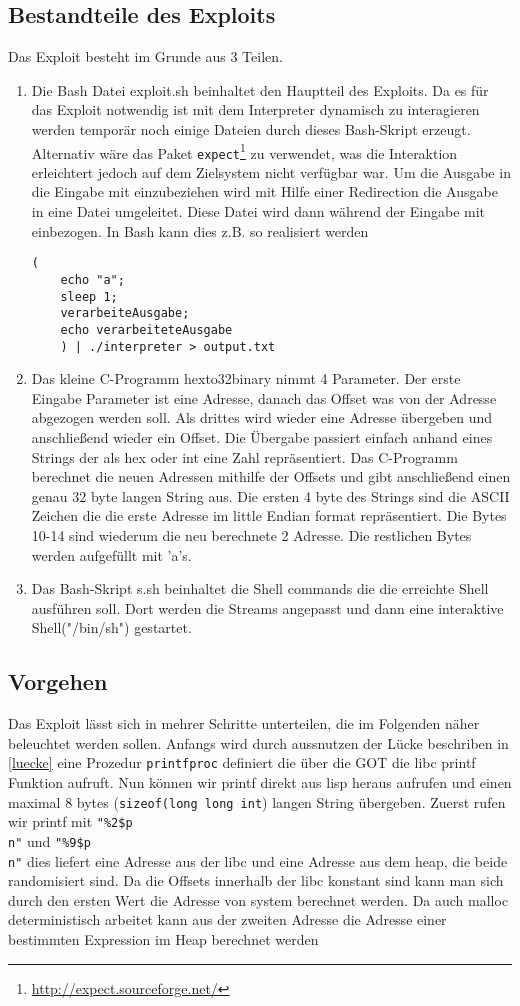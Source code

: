 \subsection{Bestandteile des Exploits}
Das Exploit besteht im Grunde aus 3 Teilen.
\begin{enumerate}
\item Die Bash Datei exploit.sh beinhaltet den Hauptteil des Exploits. Da es für das Exploit notwendig ist mit dem Interpreter dynamisch zu interagieren werden temporär noch einige Dateien durch dieses Bash-Skript erzeugt. 
Alternativ wäre das Paket \texttt{expect}\footnote{\url{http://expect.sourceforge.net/}} zu verwendet, was die Interaktion erleichtert jedoch auf dem Zielsystem nicht verfügbar war. 
Um die Ausgabe in die Eingabe mit einzubeziehen wird mit Hilfe einer Redirection die Ausgabe in eine Datei umgeleitet. Diese Datei wird dann während der Eingabe mit einbezogen. 
In Bash kann dies z.B. so realisiert werden 
\begin{lstlisting}(
	echo "a"; 
	sleep 1; 
	verarbeiteAusgabe; 
	echo verarbeiteteAusgabe
	) | ./interpreter > output.txt
\end{lstlisting}
\item Das kleine C-Programm hexto32binary nimmt 4 Parameter. Der erste Eingabe Parameter ist eine Adresse, danach das Offset was von der Adresse abgezogen werden soll. Als drittes wird wieder eine Adresse übergeben und anschließend wieder ein Offset.
Die Übergabe passiert einfach anhand eines Strings der als hex oder int eine Zahl repräsentiert. Das C-Programm berechnet die neuen Adressen mithilfe der Offsets und gibt anschließend einen genau 32 byte langen String aus. Die ersten 4 byte des Strings sind die ASCII Zeichen die die erste Adresse im little Endian format repräsentiert. Die Bytes 10-14 sind wiederum die neu berechnete 2 Adresse. Die restlichen Bytes werden aufgefüllt mit 'a's.
\item Das Bash-Skript s.sh beinhaltet die Shell commands die die erreichte Shell ausführen soll. Dort werden die Streams angepasst und dann eine interaktive Shell("/bin/sh") gestartet.
\end{enumerate}
\subsection{Vorgehen}
Das Exploit lässt sich in mehrer Schritte unterteilen, die im Folgenden näher beleuchtet werden sollen. Anfangs wird durch aussnutzen der Lücke beschriben in \ref{luecke} eine Prozedur \texttt{printfproc} definiert die über die GOT die libc printf Funktion aufruft. Nun können wir printf direkt aus lisp heraus aufrufen und einen maximal 8 bytes (\texttt{sizeof(long long int}) langen String übergeben. Zuerst rufen wir printf mit \texttt{"\%2\$p\\n"} und \texttt{"\%9\$p\\n"} dies liefert eine Adresse aus der libc und eine Adresse aus dem heap, die beide randomisiert sind. Da die Offsets innerhalb der libc konstant sind kann man sich durch den ersten Wert die Adresse von system berechnet werden. Da auch malloc deterministisch arbeitet kann aus der zweiten Adresse die Adresse einer bestimmten Expression im Heap berechnet werden



